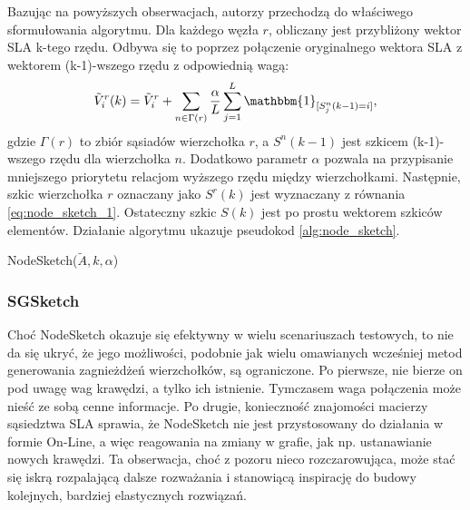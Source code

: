             Bazując na powyższych obserwacjach, autorzy przechodzą do właściwego sformułowania algorytmu. Dla każdego węzła $r$, obliczany jest przybliżony wektor SLA k-tego rzędu. Odbywa się to poprzez połączenie oryginalnego wektora SLA z wektorem (k-1)-wszego rzędu z odpowiednią wagą:
            \begin{equation} \label{eq:node_sketch_3}  
                \tilde{V}_{i}^{r}(k) = \tilde{V}_{i}^{r} + \sum\limits_{n \in 	\Gamma(r)} \frac{\alpha}{L} \sum\limits_{j = 1}^{L} \mathbbm{1}_{[S_{j}^{n}(k - 1) = i]},
            \end{equation}
            gdzie $\Gamma(r)$ to zbiór sąsiadów wierzchołka $r$, a $S^{n}(k-1)$ jest szkicem (k-1)-wszego rzędu dla wierzchołka $n$. Dodatkowo parametr $\alpha$ pozwala na przypisanie mniejszego priorytetu relacjom wyższego rzędu między wierzchołkami. Następnie, szkic wierzchołka $r$ oznaczany jako $S^{r}(k)$ jest wyznaczany z równania \ref{eq:node_sketch_1}. Ostateczny szkic $S(k)$ jest po prostu wektorem szkiców elementów. Działanie algorytmu ukazuje pseudokod \ref{alg:node_sketch}.

            \begin{algorithm}
                \caption{NodeSketch($\tilde{A},k,\alpha$)}\label{alg:node_sketch}
            \end{algorithm}

        \subsubsection*{SGSketch}
            Choć NodeSketch okazuje się efektywny w wielu scenariuszach testowych, to nie da się ukryć, że jego możliwości, podobnie jak wielu omawianych wcześniej metod generowania zagnieżdżeń wierzchołków, są ograniczone. Po pierwsze, nie bierze on pod uwagę wag krawędzi, a tylko ich istnienie. Tymczasem waga połączenia może nieść ze sobą cenne informacje. Po drugie, konieczność znajomości macierzy sąsiedztwa SLA sprawia, że NodeSketch nie jest przystosowany do działania w formie On-Line, a więc reagowania na zmiany w grafie, jak np. ustanawianie nowych krawędzi. Ta obserwacja, choć z pozoru nieco rozczarowująca, może stać się iskrą rozpalającą dalsze rozważania i stanowiącą inspirację do budowy kolejnych, bardziej elastycznych rozwiązań. 

